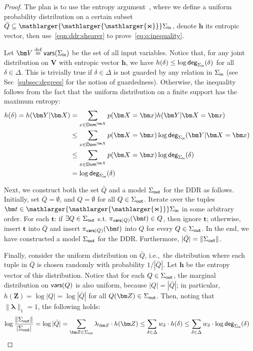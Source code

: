 \documentclass{theoretics}
\newcommand{\norm}[1]{\|#1\|}
\newcommand{\dom}{\textsf{Dom}}
\newcommand{\degree}{\text{\sf deg}}
\newcommand{\defeq}{\stackrel{\text{def}}{=}}
\newcommand{\bigjoin}{\mathlarger{\mathlarger{\mathlarger{\Join}}}}
\newcommand{\inn}{\text{\sf in}}
\newcommand{\out}{\text{\sf out}}
\newcommand{\vars}{\text{\sf vars}}
\begin{document}
\begin{proof} The plan is to use the entropy argument~\cite{MR859293},
  where we define a uniform probability distribution on a certain subset $\bar Q \subseteq
  \bigjoin \Sigma_{\inn}$, denote $\bm h$ its entropic vector, then
  use~\eqref{eqn:ddr:shearer} to prove~\eqref{eq:q:inequality}.

  Let $\bm V \defeq \vars(\Sigma_{\inn})$ be the set of all input variables. Notice that,
  for any joint distribution on $\bm V$ with entropic vector $\bm h$, we have $h(\delta)
  \leq \log \degree_{\Sigma_{\inn}}(\delta)$ for all $\delta \in \Delta$. This is trivially
  true if $\delta \in \Delta$ is not guarded
  by any relation in $\Sigma_{\inn}$
  (see Sec~\ref{subsec:degrees} for the notion of guardedness).
  Otherwise, the inequality follows from the fact that the uniform
  distribution on a finite support has the maximum entropy:
  \begin{align*}
    h(\delta) = h(\bm Y | \bm X) &=
    \sum_{x \in \dom^{\bm X}} p(\bm X = \bm x) h(\bm Y | \bm X = \bm x)\\
    &\leq
    \sum_{x \in \dom^{\bm X}} p(\bm X = \bm x) \log \degree_{\Sigma_{\inn}}(\bm Y | \bm X = \bm x)\\
    &\leq
    \sum_{x \in \dom^{\bm X}} p(\bm X = \bm x) \log \degree_{\Sigma_{\inn}}(\delta)\\
    &= \log \degree_{\Sigma_{\inn}}(\delta)
  \end{align*}


  Next, we construct both the set $\bar Q$ and a model $\Sigma_{\out}$ for the DDR as follows.
  Initially, set $\bar Q = \emptyset$, and $Q = \emptyset$ for all $Q \in \Sigma_{\out}$.
  Iterate over the tuples $\bm t \in \bigjoin \Sigma_{\inn}$ in some arbitrary order. For
  each $\bm t$: if $\exists Q \in \Sigma_{\out}$ s.t. $\pi_{\vars(Q)}(\bm t) \in Q$, then
  ignore $\bm t$; otherwise,
  insert $\bm t$ into $\bar Q$ and
  insert $\pi_{\vars(Q)}(\bm t)$ into $Q$ for every $Q \in \Sigma_{\out}$.
  In the end, we have constructed a model
  $\Sigma_{\out}$ for the DDR.
  Furthermore, $|\bar Q| = \norm{\Sigma_{\out}}$.

  Finally, consider the uniform distribution on $\bar Q$, i.e.,~the distribution where each
  tuple in $\bar Q$ is chosen randomly with probability $1/|\bar Q|$. Let $\bm h$ be the entropy
  vector of this distribution. Notice that for each $Q \in \Sigma_{\out}$, the marginal
  distribution on $\vars(Q)$ is also uniform, because $|Q| = |\bar Q|$; in particular, $h(\bm
  Z) = \log |Q| = \log |\bar Q|$ for all $Q(\bm Z) \in \Sigma_{\out}$. Then,
  noting that $\norm{\bm \lambda}_1=1$, the following holds:
  \begin{align*}
    \log \frac{\norm{\Sigma_{\out}}}{|\Sigma_\out|} = \log |\bar Q|
    = \sum_{\bm Z\in \Sigma_{\out}} \lambda_{\bm Z} \cdot h(\bm Z) \leq \sum_{\delta \in \Delta} w_\delta\cdot  h(\delta)
        \leq \sum_{\delta \in \Delta} w_\delta \cdot \log \degree_{\Sigma_{\inn}}(\delta) 
  \end{align*}
\end{proof}
\end{document}
